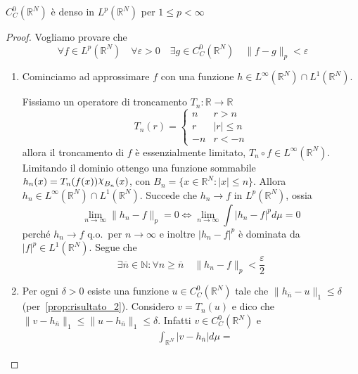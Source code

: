 \begin{proposition}\label{thm:risultato_3}
    \(C_C^{0}{(\mathbb{R}^{N})}\) è denso in \(L^p(\mathbb{R}^{N})\) per \(1 \le p < \infty\)
\end{proposition}
\begin{proof}
    Vogliamo provare che
    \[
        \forall f \in L^p(\mathbb{R}^{N}) \quad \forall \varepsilon > 0 \quad \exists g \in C_C^{0}{(\mathbb{R}^{N})} \quad \|f - g\|_p < \varepsilon
    \]
\begin{enumerate}[label = \arabic*.]
    \item Cominciamo ad approssimare \(f\) con una funzione \(h \in
        L^{\infty}{(\mathbb{R}^{N})} \cap L^{1}{(\mathbb{R}^{N})}\).

        Fissiamo un operatore di troncamento \(T_{n} : \mathbb{R} \to \mathbb{R}\) 
        \[
            T_{n}{(r)} = \begin{cases}
                n & r > n \\
                r & |r| \le  n \\
                -n & r < -n
            \end{cases}
        \]
        allora il troncamento di \(f\) è essenzialmente limitato, \(T_{n}\circ f \in L^{\infty}{(\mathbb{R}^{N})}\). 
        Limitando il dominio ottengo 
        una funzione sommabile \(h_{n} {(x)} = T_{n}{(f{(x)})}\rchi_{B_{n}} {(x)}\), 
        con \(B_{n} = \{x \in \mathbb{R}^{N}: |x| \le n\}\). Allora \(h_{n} \in
        L^\infty(\mathbb{R}^{N}) \cap L^1(\mathbb{R}^{N})\). Succede che \(h_{n}
        \to f\) in \(L^p(\mathbb{R}^{N})\), ossia 
        \[
            \lim_{n\to \infty} \|h_{n} - f\|_p = 0 \iff \lim_{n\to \infty} \int |h_{n} - f|^p d\mu = 0
        \]
        perché \(h_{n} \to f\) q.o.~per \(n \to \infty\) e inoltre \(|h_{n}
        -f|^{p}\) è dominata da \(|f|^{p} \in L^{1}{(\mathbb{R}^{N})}\). Segue che
        \[
            \exists \overline{n} \in \mathbb{N} : \forall n \ge \overline{n} \quad \|h_{n} - f\|_p < \frac{\varepsilon}{2}
        \]
    \item Per ogni \(\delta > 0\) esiste una funzione \(u \in
        C^{0}_C{(\mathbb{R}^{N})}\) tale che \(\|h_{\overline{n}} - u\|_1 \le 
        \delta\) (per~\ref{prop:risultato_2}). Considero \(v = T_{n}(u)\) e dico
        che \(\|v - h_{\overline{n}}\|_1 \le \|u - h_{\overline{n}} \|_1 \le
        \delta\).
        Infatti \(v \in C^{0}_C{(\mathbb{R}^{N})}\) e
        \begin{align*}
            &\int_{\mathbb{R}^{N}} | v- h_{\overline{n}} | d\mu = 

\end{align*}
\end{enumerate}
\end{proof}
